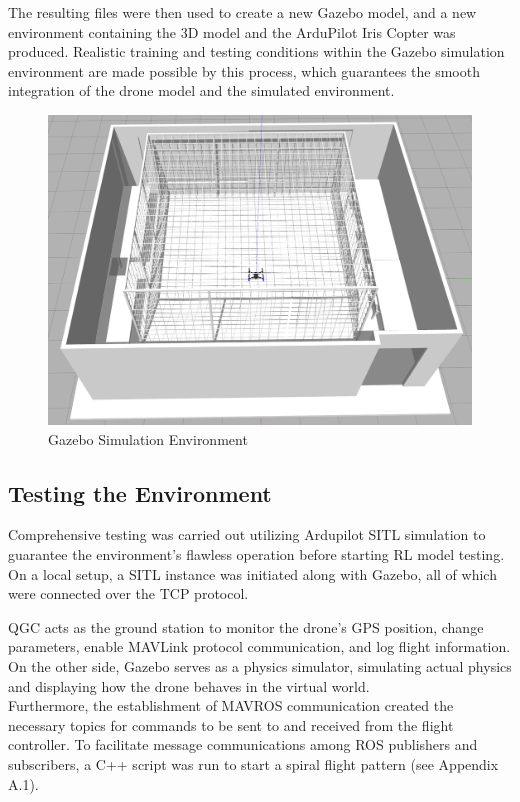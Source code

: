         The resulting files were then used to create a new Gazebo model, and a new environment containing the 3D model and the ArduPilot Iris Copter was produced. Realistic training and testing conditions within the Gazebo simulation environment are made possible by this process, which guarantees the smooth integration of the drone model and the simulated environment.
        \begin{figure}[H]
            \centering
            \includegraphics[width=0.6\linewidth]{Images/Gazebo.png}
            \caption{Gazebo Simulation Environment}
            \label{gazebo}
        \end{figure}
        \subsection{Testing the Environment}
        \color{black}
        Comprehensive testing was carried out utilizing Ardupilot SITL simulation to guarantee the environment's flawless operation before starting RL model testing. On a local setup, a SITL instance was initiated along with Gazebo, all of which were connected over the TCP protocol.

QGC acts as the ground station to monitor the drone's GPS position, change parameters, enable MAVLink protocol communication, and log flight information. On the other side, Gazebo serves as a physics simulator, simulating actual physics and displaying how the drone behaves in the virtual world.\\

Furthermore, the establishment of MAVROS communication created the necessary topics for commands to be sent to and received from the flight controller. To facilitate message communications among ROS publishers and subscribers, a C++ script was run to start a spiral flight pattern (see Appendix A.1).\\

